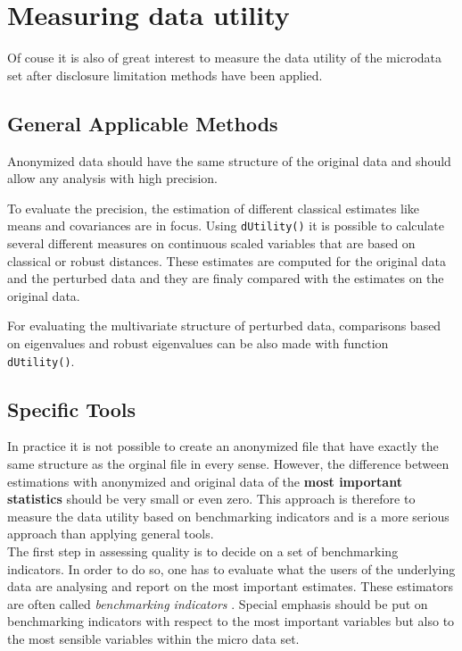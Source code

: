 \documentclass[12pt]{article}
\begin{document}
\section{Measuring data utility} \label{sub:ut}

Of couse it is also of great interest to measure the data utility of the microdata set after disclosure 
limitation methods have been applied. 

\subsection{General Applicable Methods}

Anonymized data should have the same structure of the original data 
and should allow any analysis with high precision.

To evaluate the precision, the estimation of different classical estimates like means and covariances are in focus.
Using \lstinline{dUtility()} it is possible to calculate 
several different measures on continuous scaled variables 
that are based on classical or robust distances. These estimates are computed for the original data and the 
perturbed data and they are finaly compared with the estimates on the original data. 

For evaluating the multivariate structure of perturbed data, 
comparisons based on eigenvalues and robust eigenvalues 
can be also made with function \lstinline{dUtility()}. 



\subsection{Specific Tools}


In practice it is not possible to create an anonymized file 
 that have exactly the same structure as the 
orginal file in every sense. However, the difference between estimations with anonymized and 
original data of the \textbf{most important statistics} should be very small or even zero.
This approach is therefore to measure the data utility based on benchmarking indicators 
\citep{ichim10,templ11ses} and is a more serious approach than applying general tools. \\

The first step in assessing quality is to decide on a set of benchmarking
indicators. In order to do so, one has to evaluate 
what the users of the underlying data are analysing and report on the most 
important estimates. These estimators are often called 
\textit{benchmarking indicators} \citep[see, e.g.,][]{templ11unece,templ11ses}.
Special emphasis should be put on benchmarking indicators with
respect to the most important variables but also to the most sensible variables
within the micro data set. \\
\end{document}
